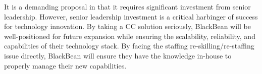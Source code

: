 It is a demanding proposal in that it requires significant investment from senior leadership. However, senior leadership investment is a critical harbinger of success for technology innovation. By taking a CC solution seriously, BlackBean will be well-positioned for future expansion while ensuring the scalability, reliability, and capabilities of their technology stack. By facing the staffing re-skilling/re-staffing issue directly, BlackBean will ensure they have the knowledge in-house to properly manage their new capabilities.
